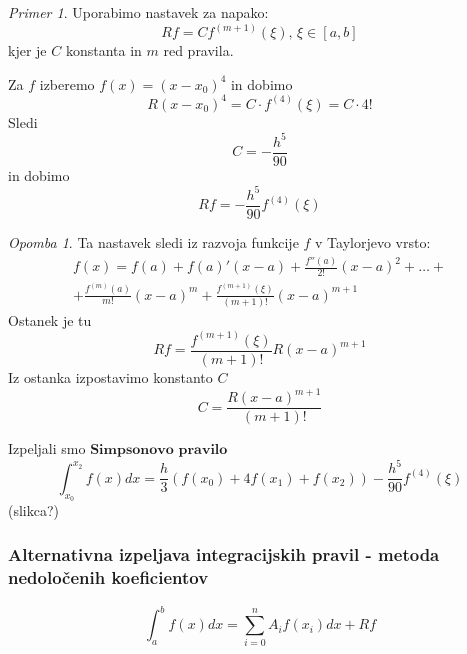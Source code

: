 \documentclass[a4paper,12pt]{article}
\theoremstyle{definition}
\theoremstyle{remark}
\newtheorem*{ex}{Primer}
\newtheorem*{rem}{Opomba}
\begin{document}
\begin{ex}
    Uporabimo nastavek za napako:
    \begin{equation*}
        Rf = C f^{(m+1)} (\xi) \text{, } \xi \in [a, b]
    \end{equation*}
    kjer je $C$ konstanta in $m$ red pravila.

    Za $f$ izberemo $f(x) = (x-x_0)^4$ in dobimo
    \begin{equation*}
        R(x-x_0)^4 = C \cdot f^{(4)} (\xi) = C\cdot4!
    \end{equation*}
    Sledi
    \begin{equation*}
        C = -\frac{h^5}{90}
    \end{equation*}
    in dobimo
    \begin{equation*}
        Rf = -\frac{h^5}{90}f^{(4)}(\xi)
    \end{equation*}

    \begin{rem}
        Ta nastavek sledi iz razvoja funkcije $f$ v Taylorjevo vrsto:
        \begin{multline*}
            f(x) = f(a) + f(a)'(x-a) + \frac{f''(a)}{2!} (x-a)^2 + \dots + \\
            + \frac{f^{(m)}(a)}{m!} (x-a)^m + \frac{f^{(m+1)}(\xi)}{(m+1)!} (x-a)^{m+1}
        \end{multline*}
        Ostanek je tu
        \begin{equation*}
            Rf = \frac{f^{(m+1)}(\xi)}{(m+1)!} R(x-a)^{m+1}
        \end{equation*}
        Iz ostanka izpostavimo konstanto $C$
        \begin{equation*}
            C = \frac{R(x-a)^{m+1}}{(m+1)!}
        \end{equation*}
    \end{rem}

    Izpeljali smo $\textbf{Simpsonovo pravilo}$
    \begin{equation*}
        \int_{x_0}^{x_2} f(x) dx = \frac{h}{3} (f(x_0) + 4f(x_1) + f(x_2)) - \frac{h^5}{90} f^{(4)}(\xi)
    \end{equation*}
    (slikca?)
\end{ex}

\subsubsection{Alternativna izpeljava integracijskih pravil - metoda nedoločenih koeficientov}
\begin{equation*}
    \int_{a}^{b} f(x) dx = \sum_{i=0}^{n} A_i f(x_i) dx + Rf
\end{equation*}
\end{document}
